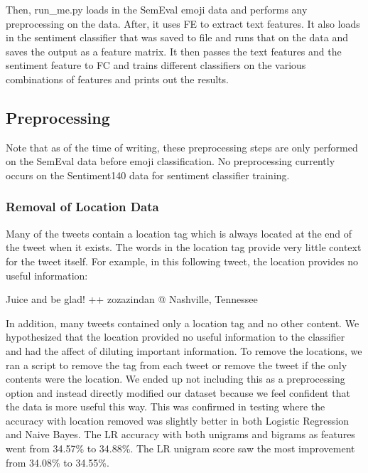 \documentclass[10pt]{article}
\begin{document}
Then, run\_me.py loads in the SemEval emoji data and performs any preprocessing on the data. After, it uses FE to extract text features. It also loads in the sentiment classifier that was saved to file and runs that on the data and saves the output as a feature matrix. It then passes the text features and the sentiment feature to FC and trains different classifiers on the various combinations of features and prints out the results.

\subsection{Preprocessing}
Note that as of the time of writing, these preprocessing steps are only performed on the SemEval data before emoji classification. No preprocessing currently occurs on the Sentiment140 data for sentiment classifier training.

\subsubsection{Removal of Location Data}
Many of the tweets contain a location tag which is always located at the end of the tweet when it exists. The words in the location tag provide very little context for the tweet itself.  For example, in this following tweet, the location provides no useful information:
\begin{center}
Juice and be glad! ++ zozazindan @ Nashville, Tennessee 
\end{center}
In addition, many tweets contained only a location tag and no other content. We hypothesized that the location provided no useful information to the classifier and had the affect of diluting important information. To remove the locations, we ran a script to remove the tag from each tweet or remove the tweet if the only contents were the location. We ended up not including this as a preprocessing option and instead directly modified our dataset because we feel confident that the data is more useful this way.  This was confirmed in testing where the accuracy with location removed was slightly better in both Logistic Regression and Naive Bayes. The LR accuracy with both unigrams and bigrams as features went from 34.57\% to 34.88\%. The LR unigram score saw the most improvement from 34.08\% to 34.55\%.
\end{document}
